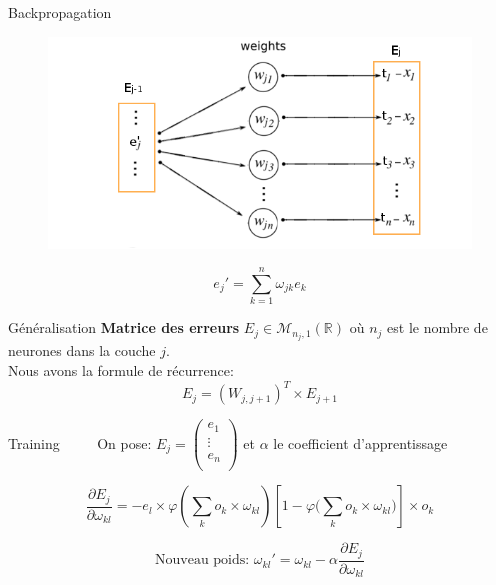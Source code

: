 \documentclass[10pt]{beamer}
\begin{document}
\begin{frame}{Backpropagation}
	\begin{figure}
  \includegraphics[scale=0.4]{retro}
	\centering
	\end{figure}
	\[e_j' = \sum_{k=1}^n \omega_{jk} e_k\]
\end{frame}

\begin{frame}{G\'en\'eralisation}
	\textbf{Matrice des erreurs} $E_j \in \mathscr{M}_{n_j,1}(\mathbb{R})$ o\`u $n_j$ est le nombre de neurones dans la couche $j$.\\
	Nous avons la formule de r\'ecurrence:
	\[E_j = (W_{j,j+1})^T \times E_{j+1}\]
\end{frame}

\begin{frame}{Training}
	$\quad \quad$ On pose: $E_j = \begin{pmatrix}
		e_1 \\
		\vdots \\
		e_n\\
	\end{pmatrix}$  et $\alpha$ le coefficient d'apprentissage

	\[\frac{\partial E_j}{\partial \omega_{kl}} = - e_l \times \varphi\left(\sum_k o_k \times \omega_{kl} \right)
	\left[1-\varphi\Big(\sum_k o_k \times \omega_{kl} \Big)\right]\times o_k\]	

	\[\text{Nouveau poids: } \omega_{kl}' = \omega_{kl} - \alpha \frac{\partial E_j}{\partial \omega_{kl}}\]
\end{frame}
\end{document}
